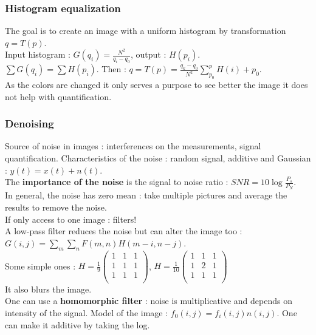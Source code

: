 \documentclass[../main.tex]{subfiles}
\begin{document}
\subsubsection{Histogram equalization}
The goal is to create an image with a uniform histogram by transformation $q=T(p)$.\\
Input histogram : $G(q_i) = \frac{N^2}{q_i-q_0}$, output : $H(p_i)$.\\
$\sum G(q_i) = \sum H(p_i)$. Then : $q = T(p) = \frac{q_k-q_0}{N^2} \sum^p_{p_0} H(i) + p_0$.\\
\warning As the colors are changed it only serves a purpose to see better the image it does not help with quantification.\\

\subsubsection{Denoising}
Source of noise in images : interferences on the measurements, signal quantification. Characteristics of the noise : random signal, additive and Gaussian : $y(t) = x(t)+n(t)$.\\
The \textbf{importance of the noise} is the signal to noise ratio : $SNR = 10\log \frac{P_s}{P_N}$.\\
In general, the noise has zero mean : take multiple pictures and average the results to remove the noise.\\
If only access to one image : filters!\\
A low-pass filter reduces the noise but can alter the image too : $G(i,j) = \sum_m \sum_n F(m,n) H(m-i, n-j)$.\\
Some simple ones : $H = \frac{1}{9} \begin{pmatrix}
    1 & 1 &1\\ 1 & 1 &1 \\ 1&1&1\\
\end{pmatrix}$, $H = \frac{1}{10} \begin{pmatrix}
    1 & 1 &1\\ 1 & 2 &1 \\ 1&1&1\\
\end{pmatrix}$\\
\warning It also blurs the image.\\

One can use a \textbf{homomorphic filter} : noise is multiplicative and depends on intensity of the signal. Model of the image : $f_0(i,j) = f_i(i,j) n(i,j)$. One can make it additive by taking the log.\\
\end{document}
